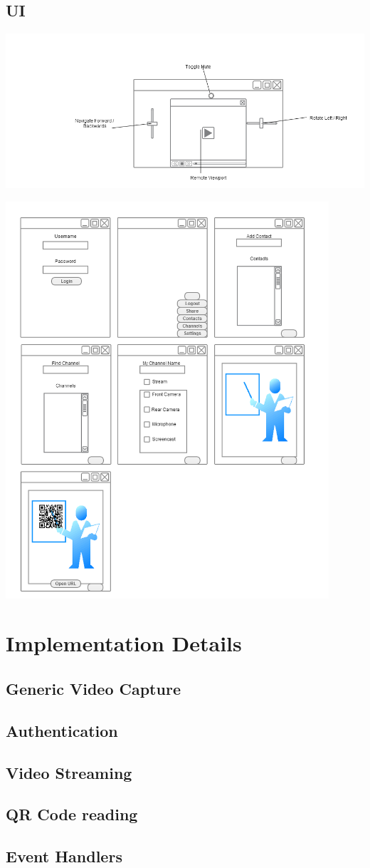 \documentclass[a4paper,12pt]{report}
\begin{document}
\section{UI}

\includegraphics[width=16cm]{MobileGUI_Labeled}

\includegraphics[width=12cm]{MobileUI}

\chapter{Implementation Details}
\section{Generic Video Capture}
\section{Authentication}
\section{Video Streaming}
\section{QR Code reading}
\section{Event Handlers}


\end{document}
